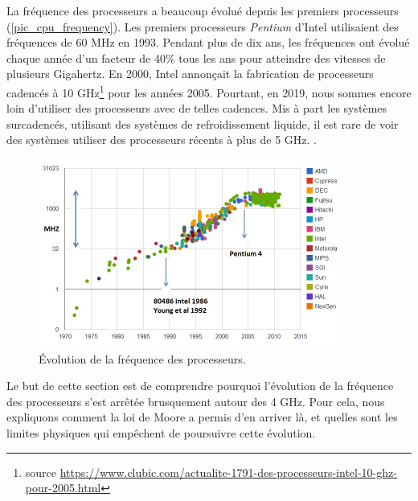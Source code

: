 La fréquence des processeurs a beaucoup évolué depuis les premiers processeurs (\autoref{pic_cpu_frequency}). Les premiers processeurs \textit{Pentium} d'Intel utilisaient des fréquences de 60 MHz en 1993. Pendant plus de dix ans, les fréquences ont évolué chaque année d'un facteur de 40\%  tous les ans pour atteindre des vitesses de plusieurs Gigahertz. En 2000, Intel annonçait la fabrication de processeurs cadencés à 10 GHz\footnote{source \url{https://www.clubic.com/actualite-1791-des-processeurs-intel-10-ghz-pour-2005.html}} pour les années 2005. Pourtant, en 2019, nous sommes encore loin d’utiliser des processeurs avec de telles cadences. Mis à part les systèmes surcadencés, utilisant des systèmes de refroidissement liquide, il est rare de voir des systèmes utiliser des processeurs récents à plus de 5 GHz.
.
\begin{figure}
    \center
    \includegraphics[width=10cm]{images/cpu_frequency.jpg}
    \caption{\label{pic_cpu_frequency} Évolution de la fréquence des processeurs\protect\footnotemark.}
\end{figure}

Le but de cette section est de comprendre pourquoi l'évolution de la fréquence des processeurs s'est arrêtée brusquement autour des 4 GHz. Pour cela, nous expliquons comment la loi de Moore a permis d'en arriver là, et quelles sont les limites physiques qui empêchent de poursuivre cette évolution.


